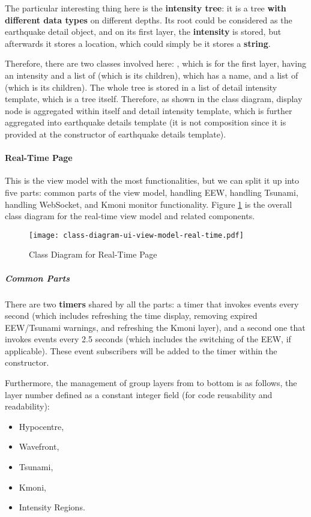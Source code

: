 The particular interesting thing here is the \textbf{intensity tree}: it is a tree \textbf{with different data types} on different depths. Its root could be considered as the earthquake detail object, and on its first layer, the \textbf{intensity} is stored, but afterwards it stores a location, which could simply be it stores a \textbf{string}.

Therefore, there are two classes involved here: , which is for the first layer, having an intensity and a list of  (which is its children), which has a name, and a list of  (which is its children). The whole tree is stored in a list of detail intensity template, which is a tree itself. Therefore, as shown in the class diagram, display node is aggregated within itself and detail intensity template, which is further aggregated into earthquake details template (it is not composition since it is provided at the constructor of earthquake details template).

\paragraph{Real-Time Page}

This is the view model with the most functionalities, but we can split it up into five parts: common parts of the view model, handling EEW, handling Tsunami, handling WebSocket, and Kmoni monitor functionality. Figure \ref{fig:class-diagram-ui-real-time} is the overall class diagram for the real-time view model and related components.

\begin{figure}[htp]
    \centering
    \texttt{[image: class-diagram-ui-view-model-real-time.pdf]}
    \caption{Class Diagram for Real-Time Page}
    \label{fig:class-diagram-ui-real-time}
\end{figure}

\subparagraph{Common Parts}

There are two \textbf{timers} shared by all the parts: a timer that invokes events every second (which includes refreshing the time display, removing expired EEW/Tsunami warnings, and refreshing the Kmoni layer), and a second one that invokes events every 2.5 seconds (which includes the switching of the EEW, if applicable). These event subscribers will be added to the timer within the constructor.

Furthermore, the management of group layers from to bottom is as follows, the layer number defined as a constant integer field (for code reusability and readability):
\begin{itemize}
    \item Hypocentre,
    \item Wavefront,
    \item Tsunami,
    \item Kmoni,
    \item Intensity Regions.
\end{itemize}

